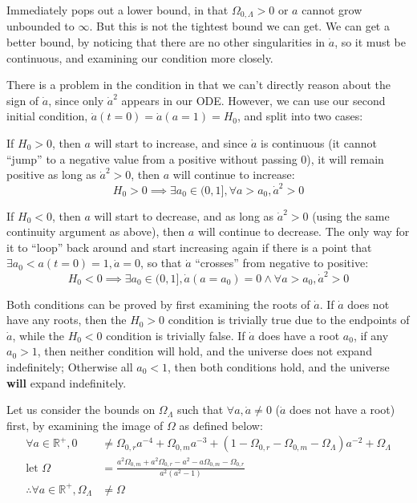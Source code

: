 \documentclass[a4paper]{scrartcl}
\begin{document}
Immediately pops out a lower bound, in that \(\Omega_{0, \Lambda} > 0\) or \(a\) cannot grow unbounded to \(\infty\). But this is not the tightest bound we can get. We can get a better bound, by noticing that there are no other singularities in \(\dot{a}\), so it must be continuous, and examining our condition more closely.

There is a problem in the condition in that we can't directly reason about the sign of \(\dot{a}\), since only \(\dot{a}^2\) appears in our ODE. However, we can use our second initial condition, \(\dot{a}(t = 0) = \dot{a}(a = 1) = H_0\), and split into two cases:

If \(H_0 > 0\), then \(a\) will start to increase, and since \(\dot{a}\) is continuous (it cannot ``jump'' to a negative value from a positive without passing 0), it will remain positive as long as \(\dot{a}^2 > 0\), then \(a\) will continue to increase:
\[H_0 > 0 \implies \exists a_0 \in (0, 1], \forall a > a_0, \dot{a}^2 > 0\]

If \(H_0 < 0\), then \(a\) will start to decrease, and as long as \(\dot{a}^2 > 0\) (using the same continuity argument as above), then \(a\) will continue to decrease. The only way for it to ``loop'' back around and start increasing again if there is a point that \(\exists a_0 < a(t = 0) = 1, \dot{a} = 0\), so that \(\dot{a}\) ``crosses'' from negative to positive:
\[H_0 < 0 \implies \exists a_0 \in (0, 1], \dot{a}(a = a_0) = 0 \land \forall a > a_0, \dot{a}^2 > 0\]

Both conditions can be proved by first examining the roots of \(\dot{a}\). If \(\dot{a}\) does not have any roots, then the \(H_0 > 0\) condition is trivially true due to the endpoints of \(\dot{a}\), while the \(H_0 < 0\) condition is trivially false. If \(\dot{a}\) does have a root \(a_0\), if any \(a_0 > 1\), then neither condition will hold, and the universe does not expand indefinitely; Otherwise all \(a_0 < 1\), then both conditions hold, and the universe \textbf{will} expand indefinitely.

Let us consider the bounds on \(\Omega_\Lambda\) such that \(\forall a, \dot{a} \neq 0\) (\(\dot{a}\) does not have a root) first, by examining the image of \(\Omega\) as defined below:
\begin{align*}
    \forall a \in \mathbb{R}^+, 0 &\neq \Omega_{0, r} a^{-4} + \Omega_{0, m} a^{-3} + \left(1 - \Omega_{0, r} - \Omega_{0, m} - \Omega_\Lambda\right) a^{-2} + \Omega_\Lambda \\
    \text{let } \Omega &= \frac{a^2 \Omega_{0, m} + a^2 \Omega_{0, r} - a^2 - a \Omega_{0, m} - \Omega_{0, r}}{a^2 \left(a^2 - 1\right)} \\
    \therefore \forall a \in \mathbb{R}^+, \Omega_\Lambda &\neq \Omega
\end{align*}
\end{document}
